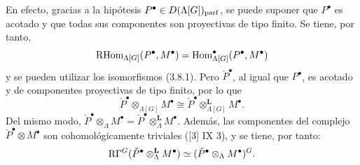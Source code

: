 En efecto, gracias a la hipótesis $P^\bullet\in D(\Lambda[G])_{\mathrm{parf}}$, se puede suponer que $P^\bullet$ es acotado y que todas sus componentes son proyectivas de tipo finito. Se tiene, por tanto,
\[
\mathrm{RHom}_{\Lambda[G]}(P^\bullet,M^\bullet)=\operatorname{Hom}_{\Lambda[G]}^\bullet(P^\bullet,M^\bullet)
\]
y se pueden utilizar los isomorfismos (3.8.1). Pero $\check P^\bullet$, al igual que $P^\bullet$, es acotado y de componentes proyectivas de tipo finito, por lo que
\[
\check P^\bullet\otimes_{\Lambda[G]}M^\bullet\cong \check P^\bullet\otimes_{\Lambda[G]}^{\mathbf L}M^\bullet.
\]
Del mismo modo, $\check P^\bullet\otimes_\Lambda M^\bullet=\check P^\bullet\otimes_\Lambda^{\mathbf L}M^\bullet$. Además, las componentes del complejo $\check P^\bullet\otimes M^\bullet$ son cohomológicamente triviales ([3] IX 3), y se tiene, por tanto:
\[
\mathrm{R}\Gamma^G(\check P^\bullet\otimes_\Lambda^{\mathbf L}M^\bullet)\simeq (\check P^\bullet\otimes_\Lambda M^\bullet)^G.
\]
